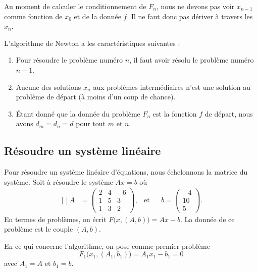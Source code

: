 Au moment de calculer le conditionnement de $F_n$, nous ne devons pas voir $x_{n-1}$ comme fonction de $x_0$ et de la donnée $f$. Il ne faut donc pas dériver à travers les $x_n$.

L'algorithme de Newton a les caractéristiques suivantes :
\begin{enumerate}

	\item
		Pour résoudre le problème numéro $n$, il faut avoir résolu le problème numéro $n-1$.
	\item
		Aucune des solutions $x_n$ aux problèmes intermédiaires n'est une solution au problème de départ (à moins d'un coup de chance).
	\item
		Étant donné que la donnée du problème $F_n$ est la fonction $f$ de départ, nous avons $d_m=d_n=d$ pour tout $m$ et $n$.

\end{enumerate}

\subsection{Résoudre un système linéaire}

Pour résoudre un système linéaire d'équations, nous échelonnons la matrice du système. Soit à résoudre le système $Ax=b$ où
\begin{equation}
	\begin{aligned}[]
		A&=\begin{pmatrix}
			2	&	4	&	-6	\\
			1	&	5	&	3	\\
			1	&	3	&	2
		\end{pmatrix}, &\text{et}&&b=\begin{pmatrix}
			-4	\\ 
			10	\\ 
			5	
		\end{pmatrix}.
	\end{aligned}
\end{equation}
En termes de problèmes, on écrit $F\big( x,(A,b) \big)=Ax-b$. La donnée de ce problème est le couple $(A,b)$.

En ce qui concerne l'algorithme, on pose comme premier problème
\begin{equation}
	F_1\big(x_1,(A_1,b_1)\big)=A_1x_1-b_1=0
\end{equation}
avec $A_1=A$ et $b_1=b$.

